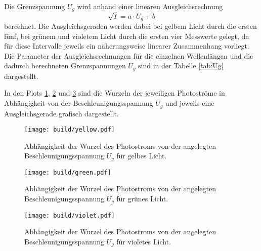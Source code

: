Die Grenzspannung $U_g$ wird anhand einer linearen Ausgleichsrechnung 
\begin{equation}
    \sqrt{I} = a\cdot U_g + b
\end{equation}
berechnet. Die Ausgleichsgeraden werden dabei bei gelbem Licht durch die ersten fünf, bei grünem und violetem Licht durch die ersten vier 
Messwerte gelegt, da für diese Intervalle jeweils ein näherungsweise linearer Zusammenhang vorliegt. 
Die Parameter der Ausgleichsrechnungen für die einzelnen Wellenlängen und die dadurch berechneten Grenzspannungen $U_g$ sind
in der Tabelle \ref{tab:Ug} dargestellt.

    \begin{table}
        \centering
        \caption{Per Ausgleichsrechnung berechnete Grenzspannungen für die einzelnen Wellenlängen.}
        \label{tab:Ug}
    \end{table}

\FloatBarrier

In den Plots \ref{fig:gelb}, \ref{fig:gruen} und \ref{fig:violet} sind die Wurzeln der jeweiligen Photoströme in Abhängigkeit von der 
Beschleunigungsspannung $U_g$ und jeweils eine Ausgleichsgerade grafisch dargestellt.

\begin{figure}
  \centering
  \texttt{[image: build/yellow.pdf]}
  \caption{Abhängigkeit der Wurzel des Photostroms von der angelegten Beschleunigungsspannung $U_g$ für gelbes Licht.}
  \label{fig:gelb}
\end{figure}
\begin{figure}
  \centering
  \texttt{[image: build/green.pdf]}
  \caption{Abhängigkeit der Wurzel des Photostroms von der angelegten Beschleunigungsspannung $U_g$ für grünes Licht.}
  \label{fig:gruen}
\end{figure}
\begin{figure}
  \centering
  \texttt{[image: build/violet.pdf]}
  \caption{Abhängigkeit der Wurzel des Photostroms von der angelegten Beschleunigungsspannung $U_g$ für violetes Licht.}
  \label{fig:violet}
\end{figure}
\FloatBarrier

